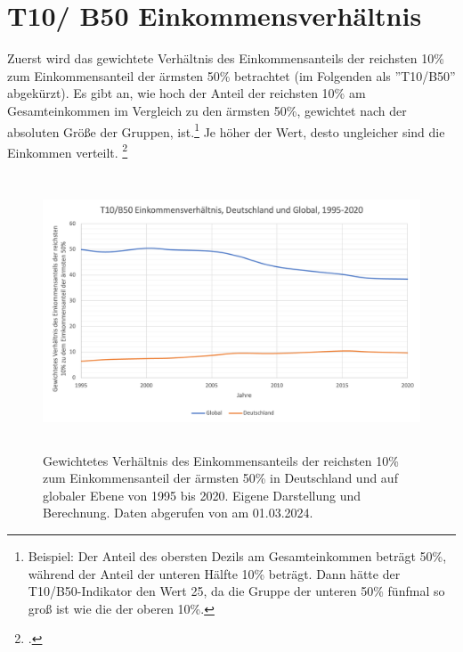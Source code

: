 \section{T10/ B50 Einkommensverhältnis}

Zuerst wird das gewichtete Verhältnis des Einkommensanteils der reichsten 10\% zum Einkommensanteil der ärmsten 50\% betrachtet (im Folgenden als ''T10/B50'' abgekürzt). Es gibt an, wie hoch der Anteil der reichsten 10\% am Gesamteinkommen im Vergleich zu den ärmsten 50\%, gewichtet nach der absoluten Grö{\ss}e der Gruppen, ist.\footnote{Beispiel: Der Anteil des obersten Dezils am Gesamteinkommen beträgt 50\%, während der Anteil der unteren Hälfte 10\% beträgt. Dann hätte der T10/B50-Indikator den Wert 25, da die Gruppe der unteren 50\% fünfmal so gro{\ss} ist wie die der oberen 10\%.} Je höher der Wert, desto ungleicher sind die Einkommen verteilt. \footcite[Vgl.][S. 31]{wir_2022} 

\begin{figure}[h]
    \centering
    \includegraphics[height=8.15cm]{Bilder/T10B50-Ratio3.png}
    \caption[T10/B50 Einkommensverhältnis, Deutschland und global, 1995-2020]{Gewichtetes Verhältnis des Einkommensanteils der reichsten 10\% zum Einkommensanteil der ärmsten 50\% in Deutschland und auf globaler Ebene von 1995 bis 2020. Eigene Darstellung und Berechnung. Daten abgerufen von \cite[][, S.55, 195]{wir_2022} am 01.03.2024.}
    \label{fig:iso_norm1}
\end{figure}

